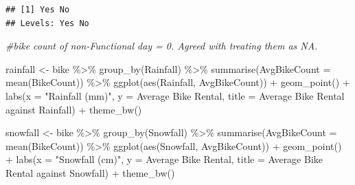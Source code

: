 \documentclass[
]{article}
\newenvironment{Shaded}{\begin{snugshade}}{\end{snugshade}}
\newcommand{\AttributeTok}[1]{\textcolor[rgb]{0.77,0.63,0.00}{#1}}
\newcommand{\CommentTok}[1]{\textcolor[rgb]{0.56,0.35,0.01}{\textit{#1}}}
\newcommand{\FunctionTok}[1]{\textcolor[rgb]{0.00,0.00,0.00}{#1}}
\newcommand{\NormalTok}[1]{#1}
\newcommand{\OtherTok}[1]{\textcolor[rgb]{0.56,0.35,0.01}{#1}}
\newcommand{\SpecialCharTok}[1]{\textcolor[rgb]{0.00,0.00,0.00}{#1}}
\newcommand{\StringTok}[1]{\textcolor[rgb]{0.31,0.60,0.02}{#1}}
\begin{document}
\begin{Shaded}
\end{Shaded}

\begin{verbatim}
## [1] Yes No 
## Levels: Yes No
\end{verbatim}

\begin{Shaded}
\begin{Highlighting}[]
\CommentTok{\#bike count of non{-}Functional day = 0. Agreed with treating them as NA.}

\NormalTok{rainfall }\OtherTok{\textless{}{-}}\NormalTok{ bike }\SpecialCharTok{\%\textgreater{}\%} \FunctionTok{group\_by}\NormalTok{(Rainfall) }\SpecialCharTok{\%\textgreater{}\%}
  \FunctionTok{summarise}\NormalTok{(}\AttributeTok{AvgBikeCount =} \FunctionTok{mean}\NormalTok{(BikeCount)) }\SpecialCharTok{\%\textgreater{}\%}
  \FunctionTok{ggplot}\NormalTok{(}\FunctionTok{aes}\NormalTok{(Rainfall, AvgBikeCount)) }\SpecialCharTok{+}
  \FunctionTok{geom\_point}\NormalTok{() }\SpecialCharTok{+} 
  \FunctionTok{labs}\NormalTok{(}\AttributeTok{x =} \StringTok{"Rainfall (mm)"}\NormalTok{, }\AttributeTok{y =} \StringTok{\textquotesingle{}Average Bike Rental\textquotesingle{}}\NormalTok{, }
       \AttributeTok{title =} \StringTok{\textquotesingle{}Average Bike Rental against Rainfall\textquotesingle{}}\NormalTok{) }\SpecialCharTok{+} 
  \FunctionTok{theme\_bw}\NormalTok{()}

\NormalTok{snowfall }\OtherTok{\textless{}{-}}\NormalTok{ bike }\SpecialCharTok{\%\textgreater{}\%} \FunctionTok{group\_by}\NormalTok{(Snowfall) }\SpecialCharTok{\%\textgreater{}\%}
  \FunctionTok{summarise}\NormalTok{(}\AttributeTok{AvgBikeCount =} \FunctionTok{mean}\NormalTok{(BikeCount)) }\SpecialCharTok{\%\textgreater{}\%}
  \FunctionTok{ggplot}\NormalTok{(}\FunctionTok{aes}\NormalTok{(Snowfall, AvgBikeCount)) }\SpecialCharTok{+}
  \FunctionTok{geom\_point}\NormalTok{() }\SpecialCharTok{+} 
  \FunctionTok{labs}\NormalTok{(}\AttributeTok{x =} \StringTok{"Snowfall (cm)"}\NormalTok{, }\AttributeTok{y =} \StringTok{\textquotesingle{}Average Bike Rental\textquotesingle{}}\NormalTok{,}
       \AttributeTok{title =} \StringTok{\textquotesingle{}Average Bike Rental against Snowfall\textquotesingle{}}\NormalTok{) }\SpecialCharTok{+} \FunctionTok{theme\_bw}\NormalTok{()}


\end{Highlighting}
\end{Shaded}
\end{document}
